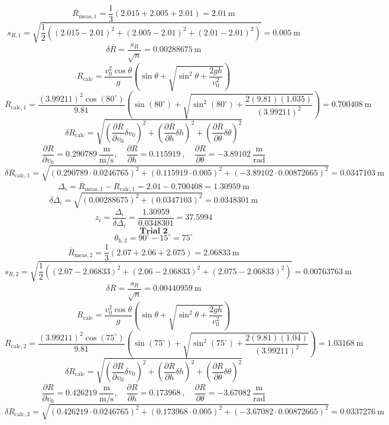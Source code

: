 \documentclass[11pt]{article}
\begin{document}
\[
\overline{R}_{\mathrm{meas},1} = \frac{1}{3}\left(2.015 + 2.005 + 2.01\right) = 2.01\ \mathrm{m}
\]
\[
s_{R,1} = \sqrt{\frac{1}{2}\left((2.015 - 2.01)^2 + (2.005 - 2.01)^2 + (2.01 - 2.01)^2\right)} = 0.005\ \mathrm{m}
\]
\[
\delta \overline{R} = \dfrac{s_R}{\sqrt{n}} = 0.00288675\ \mathrm{m}
\]
\[
R_{\mathrm{calc}} = \frac{v_0^2\cos\theta}{g}\left(\sin\theta + \sqrt{\sin^2\theta + \frac{2gh}{v_0^2}}\right)
\]
\[
R_{\mathrm{calc},1} = \frac{(3.99211)^2\cos(80^\circ)}{9.81}\left(\sin(80^\circ) + \sqrt{\sin^2(80^\circ) + \frac{2(9.81)(1.035)}{(3.99211)^2}}\right) = 0.700408\ \mathrm{m}
\]
\[
\delta R_{\mathrm{calc}} = \sqrt{\left(\frac{\partial R}{\partial v_0}\delta v_0\right)^2 + \left(\frac{\partial R}{\partial h}\delta h\right)^2 + \left(\frac{\partial R}{\partial \theta}\delta \theta\right)^2}
\]
\[
\frac{\partial R}{\partial v_0} = 0.290789\ \frac{\mathrm{m}}{\mathrm{m/s}},\quad \frac{\partial R}{\partial h} = 0.115919\ ,\quad \frac{\partial R}{\partial \theta} = -3.89102\ \frac{\mathrm{m}}{\mathrm{rad}}
\]
\[
\delta R_{\mathrm{calc},1} = \sqrt{(0.290789\cdot 0.0246765)^2 + (0.115919\cdot 0.005)^2 + (-3.89102\cdot 0.00872665)^2} = 0.0347103\ \mathrm{m}
\]
\[
\Delta_i = \overline{R}_{\mathrm{meas},1} - R_{\mathrm{calc},1} = 2.01 - 0.700408 = 1.30959\ \mathrm{m}
\]
\[
\delta \Delta_i = \sqrt{(0.00288675)^2 + (0.0347103)^2} = 0.0348301\ \mathrm{m}
\]
\[
z_i = \frac{\Delta_i}{\delta \Delta_i} = \frac{1.30959}{0.0348301} = 37.5994
\]
\[
\textbf{Trial 2}
\]
\[
\theta_{\mathrm{h},2} = 90^\circ - 15^\circ = 75^\circ
\]
\[
\overline{R}_{\mathrm{meas},2} = \frac{1}{3}\left(2.07 + 2.06 + 2.075\right) = 2.06833\ \mathrm{m}
\]
\[
s_{R,2} = \sqrt{\frac{1}{2}\left((2.07 - 2.06833)^2 + (2.06 - 2.06833)^2 + (2.075 - 2.06833)^2\right)} = 0.00763763\ \mathrm{m}
\]
\[
\delta \overline{R} = \dfrac{s_R}{\sqrt{n}} = 0.00440959\ \mathrm{m}
\]
\[
R_{\mathrm{calc}} = \frac{v_0^2\cos\theta}{g}\left(\sin\theta + \sqrt{\sin^2\theta + \frac{2gh}{v_0^2}}\right)
\]
\[
R_{\mathrm{calc},2} = \frac{(3.99211)^2\cos(75^\circ)}{9.81}\left(\sin(75^\circ) + \sqrt{\sin^2(75^\circ) + \frac{2(9.81)(1.04)}{(3.99211)^2}}\right) = 1.03168\ \mathrm{m}
\]
\[
\delta R_{\mathrm{calc}} = \sqrt{\left(\frac{\partial R}{\partial v_0}\delta v_0\right)^2 + \left(\frac{\partial R}{\partial h}\delta h\right)^2 + \left(\frac{\partial R}{\partial \theta}\delta \theta\right)^2}
\]
\[
\frac{\partial R}{\partial v_0} = 0.426219\ \frac{\mathrm{m}}{\mathrm{m/s}},\quad \frac{\partial R}{\partial h} = 0.173968\ ,\quad \frac{\partial R}{\partial \theta} = -3.67082\ \frac{\mathrm{m}}{\mathrm{rad}}
\]
\[
\delta R_{\mathrm{calc},2} = \sqrt{(0.426219\cdot 0.0246765)^2 + (0.173968\cdot 0.005)^2 + (-3.67082\cdot 0.00872665)^2} = 0.0337276\ \mathrm{m}
\]
\end{document}
